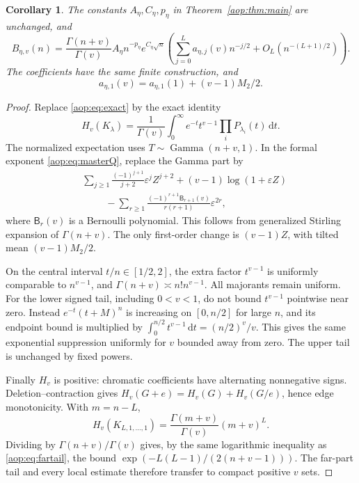 \documentclass[11pt]{article}
\newtheorem{corollary}[theorem]{Corollary}
\theoremstyle{remark}\newtheorem{remark}[theorem]{Remark}
\newcommand{\eps}{\varepsilon}
\newcommand{\dd}{\,\mathrm d}
\begin{document}
\begin{corollary}\label{aop:cor:chromatic}
The constants $A_\eta,C_\eta,p_\eta$ in Theorem~\ref{aop:thm:main} are
unchanged, and
\begin{equation}\label{aop:eq:chromatic}
 B_{\eta,v}(n)=\frac{\Gamma(n+v)}{\Gamma(v)}
 A_\eta n^{-p_\eta}e^{C_\eta\sqrt n}
 \left(\sum_{j=0}^L a_{\eta,j}(v)n^{-j/2}
                   +O_L(n^{-(L+1)/2})\right).
\end{equation}
The coefficients have the same finite construction, and
\[
 a_{\eta,1}(v)=a_{\eta,1}(1)+(v-1)M_2/2.
\]
\end{corollary}
\begin{proof}
Replace \eqref{aop:eq:exact} by the exact identity
\[
 H_v(K_\lambda)=\frac1{\Gamma(v)}\int_0^\infty
 e^{-t}t^{v-1}\prod_iP_{\lambda_i}(t)\dd t.
\]
The normalized expectation uses $T\sim\operatorname{Gamma}(n+v,1)$.
In the formal exponent \eqref{aop:eq:masterQ}, replace the Gamma part by
\begin{align*}
 &\sum_{j\ge1}\frac{(-1)^{j+1}}{j+2}\eps^jZ^{j+2}
 +(v-1)\log(1+\eps Z)\\
 &\hspace{1cm}
 -\sum_{r\ge1}\frac{(-1)^{r+1}\mathsf B_{r+1}(v)}{r(r+1)}\eps^{2r},
\end{align*}
where $\mathsf B_r(v)$ is a Bernoulli polynomial. This follows from
generalized Stirling expansion of $\Gamma(n+v)$. The only first-order
change is $(v-1)Z$, with tilted mean $(v-1)M_2/2$.

On the central interval $t/n\in[1/2,2]$, the extra factor $t^{v-1}$
is uniformly comparable to $n^{v-1}$, and
$\Gamma(n+v)\asymp n!n^{v-1}$. All majorants remain uniform. For the
lower signed tail, including $0<v<1$, do not bound $t^{v-1}$ pointwise
near zero. Instead $e^{-t}(t+M)^n$ is increasing on $[0,n/2]$ for large
$n$, and its endpoint bound is multiplied by
$\int_0^{n/2}t^{v-1}\dd t=(n/2)^v/v$. This gives the same exponential
suppression uniformly for $v$ bounded away from zero. The upper tail
is unchanged by fixed powers.

Finally $H_v$ is positive: chromatic coefficients have alternating
nonnegative signs. Deletion--contraction gives
$H_v(G+e)=H_v(G)+H_v(G/e)$, hence edge monotonicity. With $m=n-L$,
\[
 H_v(K_{L,1,\ldots,1})=\frac{\Gamma(m+v)}{\Gamma(v)}(m+v)^L.
\]
Dividing by $\Gamma(n+v)/\Gamma(v)$ gives, by the same logarithmic
inequality as \eqref{aop:eq:fartail}, the bound
$\exp(-L(L-1)/(2(n+v-1)))$. The far-part tail and every local estimate
therefore transfer to compact positive $v$ sets.
\end{proof}
\end{document}

